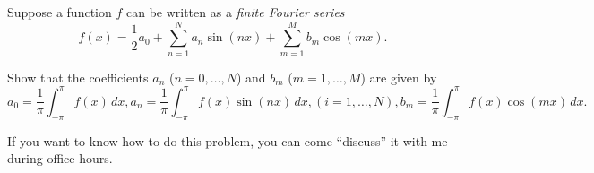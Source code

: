 \documentclass[12pt]{article}
\begin{document}
\medskip

Suppose a function $f$ can be written as a \textit{finite Fourier series}
\[
f(x) = \frac{1}{2}a_0+\sum_{n=1}^N a_n\sin(nx)+\sum_{m=1}^M b_m\cos(mx).
\]

Show that the coefficients $a_n$ ($n=0,\ldots, N$) and $b_m$ ($m=1,\ldots, M$) are given by
\[
a_0 = \frac{1}{\pi}\int_{-\pi}^\pi f(x)\,dx, a_n = \frac{1}{\pi}\int_{-\pi}^\pi f(x)\sin(nx)\,dx, (i=1,\ldots, N), b_m = \frac{1}{\pi}\int_{-\pi}^\pi f(x)\cos(mx)\,dx.
\]

\bigskip

If you want to know how to do this problem, you can come ``discuss'' it with me during office hours.
\end{document}
